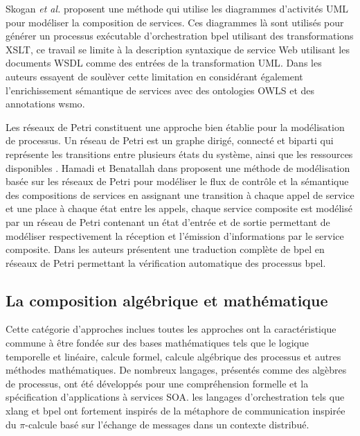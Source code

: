   Skogan \textit{et al.}  \cite{skogan2004web} proposent une méthode
  qui utilise les diagrammes d'activités \textsc{UML} pour modéliser
  la composition de services. Ces diagrammes là sont utilisés pour
  générer un processus exécutable d'orchestration \acrshort{bpel}
  utilisant des transformations \textsc{XSLT}, ce travail se limite à
  la description syntaxique de service Web utilisant les documents
  \textsc{WSDL} comme des entrées de la transformation
  \textsc{UML}. Dans \cite{gronmo2005model} les auteurs essayent de
  soulèver cette limitation en considérant également l'enrichissement
  sémantique de services avec des ontologies \textsc{OWLS} et des
  annotations \acrshort{wsmo}.\medskip

  Les réseaux de Petri \cite{petri1962kommunikation} constituent une
  approche bien établie pour la modélisation de processus. Un réseau
  de Petri est un graphe dirigé, connecté et biparti qui représente
  les transitions entre plusieurs états du système, ainsi que les
  ressources disponibles \cite{dumez2010approche}. Hamadi et
  Benatallah dans \cite{hamadi2003petri} proposent une méthode de
  modélisation basée sur les réseaux de Petri pour modéliser le flux
  de contrôle et la sémantique des compositions de services en
  assignant une transition à chaque appel de service et une place à
  chaque état entre les appels, chaque service composite est modélisé
  par un réseau de Petri contenant un état d'entrée et de sortie
  permettant de modéliser respectivement la réception et l'émission
  d'informations par le service composite. Dans
  \cite{ouyang2007formal} les auteurs présentent une traduction
  complète de \acrshort{bpel} en réseaux de Petri permettant la
  vérification automatique des processus \acrshort{bpel}.

  \subsection{La composition algébrique et mathématique}
  \label{sec:les-apprc-math}
  Cette catégorie d'approches inclues toutes les approches ont la
  caractéristique commune à être fondée sur des bases mathématiques
  tels que le logique temporelle et linéaire, calcule formel, calcule
  algébrique des processus et autres méthodes mathématiques. De
  nombreux langages, présentés comme des algèbres de processus, ont
  été développés pour une compréhension formelle et la spécification
  d'applications à services \textsc{SOA}. les langages d'orchestration
  tels que \acrshort{xlang} et \acrshort{bpel} ont fortement inspirés
  de la métaphore de communication inspirée du $\pi$-calcule basé sur
  l'échange de messages dans un contexte distribué.\medskip

